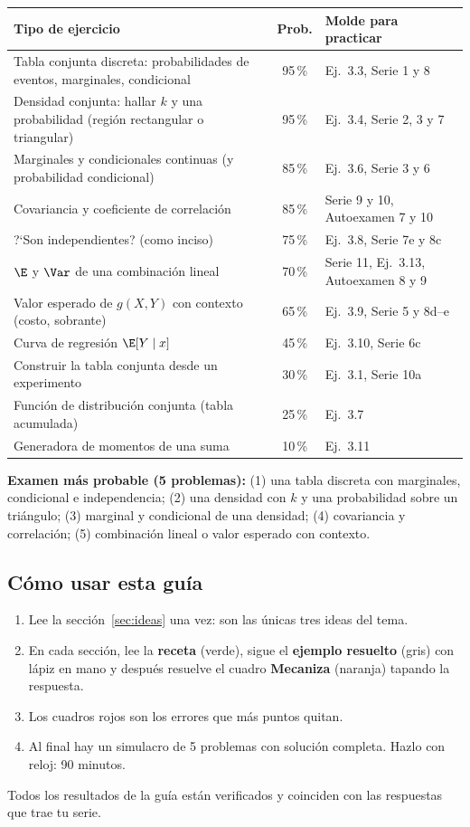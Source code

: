 \begin{center}\small
\begin{tabular}{p{6.6cm}cp{5.6cm}}
\toprule
Tipo de ejercicio & Prob. & Molde para practicar\\
\midrule
Tabla conjunta discreta: probabilidades de eventos, marginales, condicional & 95\,\% & Ej.~3.3, Serie 1 y 8\\
Densidad conjunta: hallar $k$ y una probabilidad (regi\'on rectangular o triangular) & 95\,\% & Ej.~3.4, Serie 2, 3 y 7\\
Marginales y condicionales continuas (y probabilidad condicional) & 85\,\% & Ej.~3.6, Serie 3 y 6\\
Covariancia y coeficiente de correlaci\'on & 85\,\% & Serie 9 y 10, Autoexamen 7 y 10\\
?`Son independientes? (como inciso) & 75\,\% & Ej.~3.8, Serie 7e y 8c\\
$\E$ y $\Var$ de una combinaci\'on lineal & 70\,\% & Serie 11, Ej.~3.13, Autoexamen 8 y 9\\
Valor esperado de $g(X,Y)$ con contexto (costo, sobrante) & 65\,\% & Ej.~3.9, Serie 5 y 8d--e\\
Curva de regresi\'on $\E[Y\mid x]$ & 45\,\% & Ej.~3.10, Serie 6c\\
Construir la tabla conjunta desde un experimento & 30\,\% & Ej.~3.1, Serie 10a\\
Funci\'on de distribuci\'on conjunta (tabla acumulada) & 25\,\% & Ej.~3.7\\
Generadora de momentos de una suma & 10\,\% & Ej.~3.11\\
\bottomrule
\end{tabular}
\end{center}

\textbf{Examen m\'as probable (5 problemas):} (1) una tabla discreta con marginales, condicional e independencia;
(2) una densidad con $k$ y una probabilidad sobre un tri\'angulo; (3) marginal y condicional de una densidad;
(4) covariancia y correlaci\'on; (5) combinaci\'on lineal o valor esperado con contexto.

\subsection{C\'omo usar esta gu\'ia}

\begin{enumerate}
\item Lee la secci\'on~\ref{sec:ideas} una vez: son las \'unicas tres ideas del tema.
\item En cada secci\'on, lee la \textbf{receta} (verde), sigue el \textbf{ejemplo resuelto} (gris) con l\'apiz en mano
y despu\'es resuelve el cuadro \textbf{Mecaniza} (naranja) tapando la respuesta.
\item Los cuadros rojos son los errores que m\'as puntos quitan.
\item Al final hay un simulacro de 5 problemas con soluci\'on completa. Hazlo con reloj: 90 minutos.
\end{enumerate}
Todos los resultados de la gu\'ia est\'an verificados y coinciden con las respuestas que trae tu serie.

